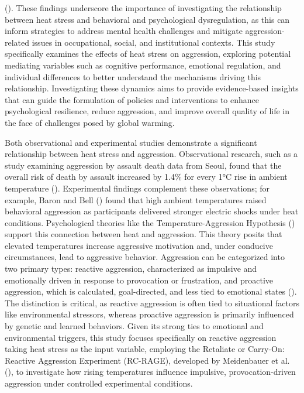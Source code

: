 \documentclass[
  man,
  floatsintext,
  longtable,
  nolmodern,
  notxfonts,
  notimes,
  colorlinks=true,linkcolor=blue,citecolor=blue,urlcolor=blue]{apa7}
\begin{document}
(). These findings underscore the importance of investigating the
relationship between heat stress and behavioral and psychological
dysregulation, as this can inform strategies to address mental health
challenges and mitigate aggression-related issues in occupational,
social, and institutional contexts. This study specifically examines the
effects of heat stress on aggression, exploring potential mediating
variables such as cognitive performance, emotional regulation, and
individual differences to better understand the mechanisms driving this
relationship. Investigating these dynamics aims to provide
evidence-based insights that can guide the formulation of policies and
interventions to enhance psychological resilience, reduce aggression,
and improve overall quality of life in the face of challenges posed by
global warming.

Both observational and experimental studies demonstrate a significant
relationship between heat stress and aggression. Observational research,
such as a study examining aggression by assault death data from Seoul,
found that the overall risk of death by assault increased by 1.4\% for
every 1°C rise in ambient temperature
(). Experimental findings complement these observations; for
example, Baron and Bell
() found that high
ambient temperatures raised behavioral aggression as participants
delivered stronger electric shocks under heat conditions. Psychological
theories like the Temperature-Aggression Hypothesis
() support this connection between heat and aggression. This theory
posits that elevated temperatures increase aggressive motivation and,
under conducive circumstances, lead to aggressive behavior. Aggression
can be categorized into two primary types: reactive aggression,
characterized as impulsive and emotionally driven in response to
provocation or frustration, and proactive aggression, which is
calculated, goal-directed, and less tied to emotional states
(). The distinction is critical, as reactive aggression is often
tied to situational factors like environmental stressors, whereas
proactive aggression is primarily influenced by genetic and learned
behaviors. Given its strong ties to emotional and environmental
triggers, this study focuses specifically on reactive aggression taking
heat stress as the input variable, employing the Retaliate or Carry-On:
Reactive Aggression Experiment (RC-RAGE), developed by Meidenbauer et
al.
(), to
investigate how rising temperatures influence impulsive,
provocation-driven aggression under controlled experimental conditions.
\end{document}
